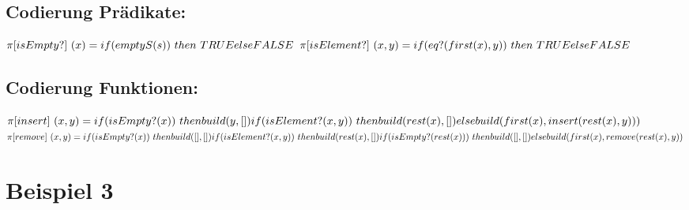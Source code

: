 \documentclass[12pt,runningheads,a4paper]{llncs}
\begin{document}
\subsection*{Codierung Prädikate:}
$\pi[isEmpty?] \ (x) = \\
if(emptyS(s)) \ then \ TRUE\\
else\\
FALSE\\
$
$
\\ \pi[isElement?] \ (x,y) = \\
if(eq?(first(x), y)) \ then \ TRUE\\
else\\
FALSE\\
$
\subsection*{Codierung Funktionen:}
$
\pi[insert] \ (x,y) = \\
if(isEmpty?(x)) \ then \\
build(y, []) \\
if(isElement?(x,y)) \ then \\
build(rest(x), []) \\
else \\
build(first(x), insert(rest(x), y)))\\
$
$
\\ \pi[remove] \ (x,y) = \\
if(isEmpty?(x)) \ then \\
build([],[]) \\
if(isElement?(x,y)) \ then \\
build(rest(x), []) \\
if(isEmpty?(rest(x))) \ then \\
build([], []) \\
else\\
build(first(x), remove(rest(x), y))
$

\section*{Beispiel 3}
\end{document}
